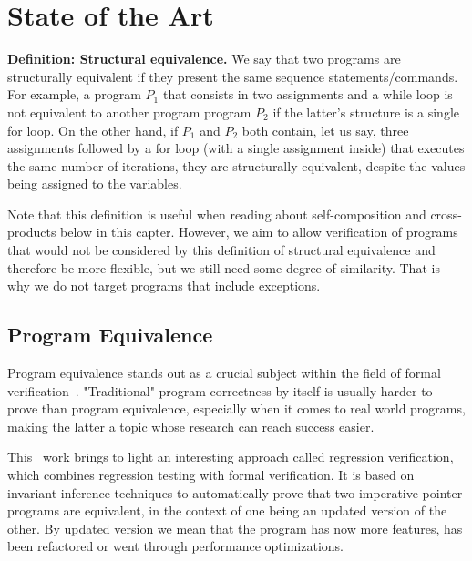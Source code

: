 
%

\makeatletter
\newcommand{\ntifpkgloaded}{%
  \@ifpackageloaded%
}
\makeatother


\chapter{State of the Art}
\label{cha:state_of_the_art}

\textbf{Definition: Structural equivalence.} We say that two programs are structurally equivalent if they present the same sequence statements/commands.
For example, a program \emph{$P_1$} that consists in two assignments and a while loop is not equivalent to another program program \emph{$P_2$} if the latter's structure is a single for loop.
On the other hand, if \emph{$P_1$} and \emph{$P_2$} both contain, let us say, three assignments followed by a for loop (with a single assignment inside) that executes the same number of iterations, they are structurally equivalent, despite the values being assigned to the variables.

Note that this definition is useful when reading about self-composition and cross-products below in this capter.
However, we aim to allow verification of programs that would not be considered by this definition of structural equivalence and therefore be more flexible, but we still need some degree of similarity.
That is why we do not target programs that include exceptions.


\section{Program Equivalence}
\label{sec:program_equivalence}

Program equivalence stands out as a crucial subject within the field of formal verification~\cite{DBLP:journals/fmsd/Strichman18}.
"Traditional" program correctness by itself is usually harder to prove than program equivalence, especially when it comes to real world programs, making the latter a topic whose research can reach success easier.

This~\cite{DBLP:journals/fmsd/KlebanovRU18} work brings to light an interesting approach called regression verification, which combines regression testing with formal verification.
It is based on invariant inference techniques to automatically prove that two imperative pointer programs are equivalent, in the context of one being an updated version of the other.
By updated version we mean that the program has now more features, has been refactored or went through performance optimizations.

